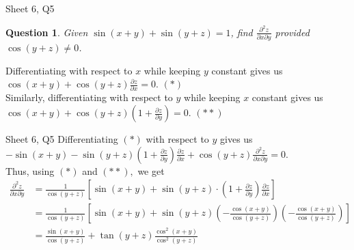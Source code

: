 \documentclass[aspectratio=169]{beamer}
\newtheorem{qsn}{Question}
\begin{document}
\begin{frame}{Sheet 6, Q5}
    \begin{qsn}
        Given $\sin (x+y) + \sin (y+z) = 1$, find $\frac{\partial^2 z}{\partial x \partial y}$ provided $\cos (y+z) \ne 0$.
    \end{qsn}
     {
    Differentiating with respect to $x$ while keeping $y$ constant gives us $\cos (x+y)+\cos (y+z) \frac{\partial z}{\partial x}=0.$ \hfill $(*)$\\
		}
     {
    Similarly, differentiating with respect to $y$ while keeping $x$ constant gives us $\cos (x+y)+\cos (y+z)\left(1+\frac{\partial z}{\partial y}\right)=0.$ \hfill $(**)$\\
		}

\end{frame}

\begin{frame}{Sheet 6, Q5}
    Differentiating $(*)$ with respect to $y$ gives us $-\sin (x+y)-\sin (y+z)\left(1+\frac{\partial z}{\partial y}\right) \frac{\partial z}{\partial x}+\cos (y+z) \frac{\partial^{2} z}{\partial x \partial y}=0.$
    \pause
    \\Thus, using $(*)$ and $(**),$ we get
	\begin{align*} 
	\frac{\partial^{2} z}{\partial x \partial y} &=\frac{1}{\cos (y+z)}\left[\sin (x+y)+\sin (y+z) \cdot\left(1+\frac{\partial z}{\partial y}\right) \frac{\partial z}{\partial x}\right] \\[10pt]
	&=\frac{1}{\cos (y+z)}\left[\sin (x+y)+\sin (y+z)\left(-\frac{\cos (x+y)}{\cos (y+z)}\right)\left(-\frac{\cos (x+y)}{\cos (y+z)}\right)\right] 
	\\[10pt] &=\frac{\sin (x+y)}{\cos (y+z)}+\tan (y+z) \frac{\cos ^{2}(x+y)}{\cos ^{2}(y+z)} \end{align*}
\end{frame}
\end{document}
